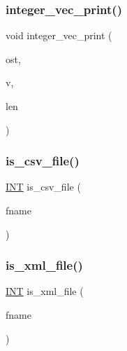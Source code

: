 \mbox{\label{util_8_c_a180b6872d1a599495f3fec2f0949ec15}} 
\subsubsection{\texorpdfstring{integer\+\_\+vec\+\_\+print()}{integer\_vec\_print()}}
{\footnotesize\ttfamily void integer\+\_\+vec\+\_\+print (\begin{DoxyParamCaption}\item[{ostream \&}]{ost,  }\item[{int $\ast$}]{v,  }\item[{int}]{len }\end{DoxyParamCaption})}

\mbox{\label{util_8_c_ae292ebebfa911bb30a0cd3964371bb7b}} 
\subsubsection{\texorpdfstring{is\+\_\+csv\+\_\+file()}{is\_csv\_file()}}
{\footnotesize\ttfamily \mbox{\hyperlink{galois_8h_a09fddde158a3a20bd2dcadb609de11dc}{I\+NT}} is\+\_\+csv\+\_\+file (\begin{DoxyParamCaption}\item[{const \mbox{\hyperlink{galois_8h_ab6cc7b4aeb6ea31aba2b3fbfc83ff5e6}{B\+Y\+TE}} $\ast$}]{fname }\end{DoxyParamCaption})}

\mbox{\label{util_8_c_aec83db8875eff88b15b58c75eedf6f80}} 
\subsubsection{\texorpdfstring{is\+\_\+xml\+\_\+file()}{is\_xml\_file()}}
{\footnotesize\ttfamily \mbox{\hyperlink{galois_8h_a09fddde158a3a20bd2dcadb609de11dc}{I\+NT}} is\+\_\+xml\+\_\+file (\begin{DoxyParamCaption}\item[{const \mbox{\hyperlink{galois_8h_ab6cc7b4aeb6ea31aba2b3fbfc83ff5e6}{B\+Y\+TE}} $\ast$}]{fname }\end{DoxyParamCaption})}

